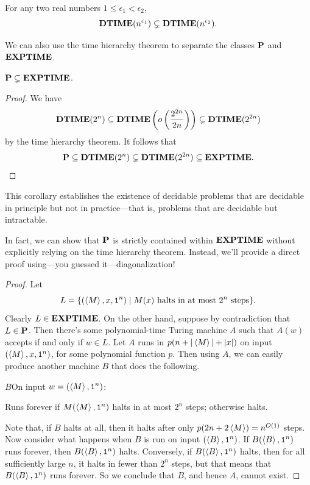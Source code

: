 \documentclass[11pt,twoside=off,numbers=noenddot]{scrbook}
\begin{document}
\begin{corollary}
  For any two real numbers $1 \leq \epsilon_1 < \epsilon_2$,
  \[ \textbf{DTIME}(n^{\epsilon_1}) \subsetneq \textbf{DTIME}(n^{\epsilon_2}). \]
\end{corollary}

We can also use the time hierarchy theorem to separate the classes $\textbf{P}$ and $\textbf{EXPTIME}$.

\begin{corollary}
  $\textbf{P} \subsetneq \textbf{EXPTIME}$.
\end{corollary}

\begin{proof}
  We have
  \[ \textbf{DTIME}(2^n) \subseteq \textbf{DTIME}\left(o\left(\frac{2^{2n}}{2n}\right)\right) \subsetneq \textbf{DTIME}(2^{2n}) \]
  by the time hierarchy theorem. It follows that
  \[ \textbf{P} \subseteq \textbf{DTIME}(2^n) \subsetneq \textbf{DTIME}(2^{2n}) \subseteq \textbf{EXPTIME}. \]
\end{proof}

This corollary establishes the existence of decidable problems that are decidable in principle but not in practice—that is, problems that are decidable but intractable.

\begin{remark}
  In fact, we can show that $\textbf{P}$ is strictly contained within $\textbf{EXPTIME}$ without explicitly relying on the time hierarchy theorem. Instead, we'll provide a direct proof using—you guessed it—diagonalization!

  \begin{proof}
    Let
    \[ L = \{ (\left< M \right>, x, \texttt{1}^n) \mid \text{$M(x)$ halts in at most $2^n$ steps} \}. \]
    Clearly $L \in \textbf{EXPTIME}$. On the other hand, suppose by contradiction that $L \in \textbf{P}$. Then there's some polynomial-time Turing machine $A$ such that $A(w)$ accepts if and only if $w \in L$. Let $A$ runs in $p(n + | \left< M \right> | + | x |)$ on input $(\left< M \right>, x, \texttt{1}^n)$, for some polynomial function $p$. Then using $A$, we can easily produce another machine $B$ that does the following.

    \begin{turing}{$B$}{On input $w = (\left< M \right>, \texttt{1}^n)$:}
    \item Runs forever if $M(\left< M \right>, \texttt{1}^n)$ halts in at most $2^n$ steps; otherwise halts.
    \end{turing}

    Note that, if $B$ halts at all, then it halts after only $p(2n + 2 \left< M \right>) = n^{O(1)}$ steps. Now consider what happens when $B$ is run on input $(\left< B \right>, \texttt{1}^n)$. If $B(\left< B \right>, \texttt{1}^n)$ runs forever, then $B(\left< B \right>, \texttt{1}^n)$ halts. Conversely, if $B(\left< B \right>, \texttt{1}^n)$ halts, then for all sufficiently large $n$, it halts in fewer than $2^n$ steps, but that means that $B(\left< B \right>, \texttt{1}^n)$ runs forever. So we conclude that $B$, and hence $A$, cannot exist.
  \end{proof}
\end{remark}
\end{document}
